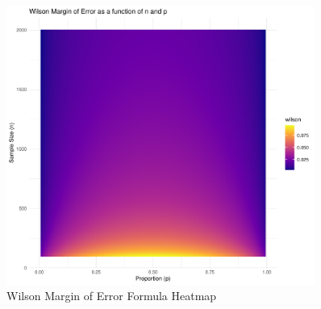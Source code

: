 \documentclass{article}\usepackage[]{graphicx}\usepackage[]{xcolor}
\begin{document}
\begin{figure}[h]
\centering
\includegraphics[width=0.9\textwidth]{Wilsonheatmap.pdf}
\caption{Wilson Margin of Error Formula Heatmap}
\end{figure}
\end{document}
